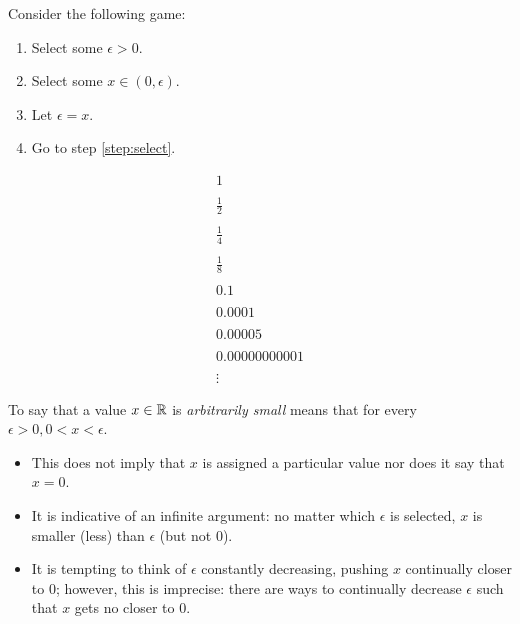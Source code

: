 \documentclass[letterpaper,12pt,fleqn]{article}
\newcommand{\e}{\epsilon}
\begin{document}
\begin{example}
  Consider the following game:
  \begin{enumerate}
  \item Select some \(\e>0\).
  \item\label{step:select} Select some \(x\in(0,\e)\).
  \item Let \(\e=x\).
  \item Go to step \ref{step:select}.
  \end{enumerate}

  \[\begin{array}{l}
  1 \\
  \\
  \frac{1}{2} \\
  \\
  \frac{1}{4} \\
  \\
  \frac{1}{8} \\
  \\
  0.1 \\
  \\
  0.0001 \\
  \\
  0.00005 \\
  \\
  0.00000000001 \\
  \\
  \vdots
  \end{array}\]
\end{example}

\begin{definition}
  To say that a value \(x\in\mathbb{R}\) is \emph{arbitrarily small} means that for every \(\e>0,0<x<\e\).
\end{definition}

\begin{itemize}[left=0in]
\item This does not imply that \(x\) is assigned a particular value nor does it say that \(x=0\).
\item It is indicative of an infinite argument: no matter which \(\e\) is selected, \(x\) is smaller (less) than
  \(\e\) (but not \(0\)).
\item It is tempting to think of \(\e\) constantly decreasing, pushing \(x\) continually closer to \(0\); however,
  this is imprecise: there are ways to continually decrease \(\e\) such that \(x\) gets no closer to \(0\).
\end{itemize}
\end{document}
